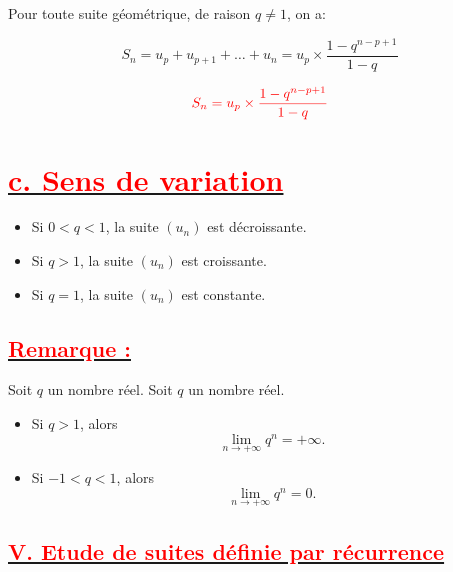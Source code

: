 \documentclass{article}
\begin{document}
Pour toute suite géométrique, de raison $q\neq 1$, on a:

%

$$S_{n}=u_{p}+u_{p+1}+\ldots+u_{n}=u_{p}\times\dfrac{1-q^{n-p+1}}{1-q}$$

\begin{mdframed}[linecolor=red] %
    \[
    \color{red} S_{n}=u_{p}\times\dfrac{1-q^{n-p+1}}{1-q}
    \]
\end{mdframed}
\section*{\underline{\textbf{\textcolor{red}{c. Sens de variation}}}}
    \begin{itemize}
        \item Si $0 < q < 1$, la suite $\left(u_{n}\right)$ est décroissante.
        \item Si $q > 1$, la suite $\left(u_{n}\right)$ est croissante.
        \item Si $q=1$, la suite $\left(u_{n}\right)$ est constante.
    \end{itemize}


\subsection*{\underline{\textbf{\textcolor{red}{Remarque :}}}}
Soit $q$ un nombre réel.
Soit \( q \) un nombre réel.

\begin{itemize}
    \item Si \( q > 1 \), alors
    \[
    \lim_{n \rightarrow +\infty} q^n = +\infty.
    \]
    
    \item Si \( -1 < q < 1 \), alors
    \[
    \lim_{n \rightarrow +\infty} q^n = 0.
    \]
\end{itemize}
\subsection*{\underline{\textbf{\textcolor{red}{V. Etude de suites définie par récurrence}}}}
\end{document}
